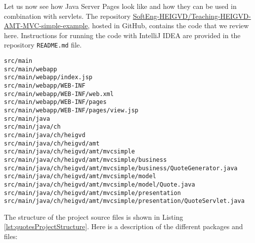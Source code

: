 Let us now see how Java Server Pages look like and how they can be used in combination with servlets. The repository \href{https://github.com/SoftEng-HEIGVD/Teaching-HEIGVD-AMT-MVC-simple-example}{SoftEng-HEIGVD/Teaching-HEIGVD-AMT-MVC-simple-example}, hosted in GitHub, contains the code that we review here. Instructions for running the code with IntelliJ IDEA are provided in the repository \texttt{README.md} file.

\vspace{10pt}
\begin{minipage}{\linewidth}
\begin{lstlisting}[frame=single]
src/main
src/main/webapp
src/main/webapp/index.jsp
src/main/webapp/WEB-INF
src/main/webapp/WEB-INF/web.xml
src/main/webapp/WEB-INF/pages
src/main/webapp/WEB-INF/pages/view.jsp
src/main/java
src/main/java/ch
src/main/java/ch/heigvd
src/main/java/ch/heigvd/amt
src/main/java/ch/heigvd/amt/mvcsimple
src/main/java/ch/heigvd/amt/mvcsimple/business
src/main/java/ch/heigvd/amt/mvcsimple/business/QuoteGenerator.java
src/main/java/ch/heigvd/amt/mvcsimple/model
src/main/java/ch/heigvd/amt/mvcsimple/model/Quote.java
src/main/java/ch/heigvd/amt/mvcsimple/presentation
src/main/java/ch/heigvd/amt/mvcsimple/presentation/QuoteServlet.java
\end{lstlisting}
\end{minipage}

The structure of the project source files is shown in Listing \ref{lst:quotesProjectStructure}. Here is a description of the different packages and files:

